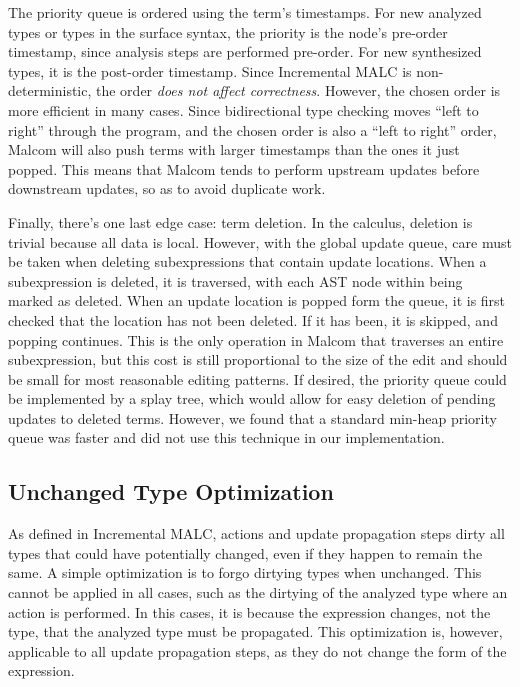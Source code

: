 The priority queue is ordered using the term's timestamps. For new analyzed types or types in the surface syntax, the priority is the node's pre-order timestamp, since analysis steps are performed pre-order. For new synthesized types, it is the post-order timestamp. Since Incremental MALC is non-deterministic, the order \emph{does not affect correctness}.
However, the chosen order is more efficient in many cases. Since bidirectional type checking moves ``left to right'' through the program, and the chosen order is also a ``left to right'' order, Malcom will also push terms with larger timestamps than the ones it just popped. This means that Malcom tends to perform upstream updates before downstream updates, so as to avoid duplicate work. 

Finally, there's one last edge case: term deletion. In the calculus, deletion is trivial because all data is local. However, with the global update queue, care must be taken when deleting subexpressions that contain update locations. When a subexpression is deleted, it is traversed, with each AST node within being marked as deleted. When an update location is popped form the queue, it is first checked that the location has not been deleted. If it has been, it is skipped, and popping continues. This is the only operation in Malcom that traverses an entire subexpression, but this cost is still proportional to the size of the edit and should be small for most reasonable editing patterns. If desired, the priority queue could be implemented by a splay tree, which would allow for easy deletion of pending updates to deleted terms. However, we found that a standard min-heap priority queue was faster and did not use this technique in our implementation.

\subsection{Unchanged Type Optimization}

As defined in Incremental MALC, actions and update propagation steps dirty all types that could have potentially changed, even if they happen to remain the same. A simple optimization is to forgo dirtying types when unchanged. This cannot be applied in all cases, such as the dirtying of the analyzed type where an action is performed. In this cases, it is because the expression changes, not the type, that the analyzed type must be propagated. This optimization is, however, applicable to all update propagation steps, as they do not change the form of the expression. 

